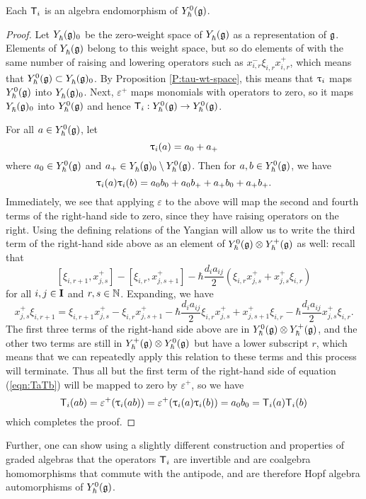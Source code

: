 \begin{lemma}\label{L:mbraid-hom}
    Each $\mbraid_i$ is an algebra endomorphism of $\Yhg[0]$.
\end{lemma}
\begin{proof}
    Let $\Yhg_0$ be the zero-weight space of $\Yhg$ as a representation of $\g$.
    Elements of $\Yhg$ belong to this weight space, but so do elements of with the same number of raising and lowering operators such as $x^-_{i,r}\xi_{i,r}x^+_{i,r}$, which means that $\Yhg[0]\subset\Yhg_0$.
    By Proposition \ref{P:tau-wt-space}, this means that $\braid_i$ maps $\Yhg[0]$ into $\Yhg_0$.
    Next, $\varepsilon^+$ maps monomials with operators to zero, so it maps $\Yhg_0$ into $\Yhg[0]$ and hence $\mbraid_i:\Yhg[0]\to\Yhg[0]$.

    For all $a\in\Yhg[0]$, let
    \[\braid_i(a) = a_0+a_+\]
    where $a_0\in\Yhg[0]$ and $a_+\in\Yhg_0\setminus\Yhg[0]$.
    Then for $a,b\in\Yhg[0]$, we have
    \begin{equation}\label{eqn:TaTb}
        \braid_i(a)\braid_i(b) = a_0b_0 + a_0b_+ + a_+b_0 + a_+b_+.
    \end{equation}
    Immediately, we see that applying $\varepsilon$ to the above will map the second and fourth terms of the right-hand side to zero, since they have raising operators on the right.
    Using the defining relations of the Yangian will allow us to write the third term of the right-hand side above as an element of $\Yhg[0]\otimes\Yhg[+]$ as well: recall that
    \[[\xi_{i,r+1},x^+_{j,s}]-[\xi_{i,r},x^+_{j,s+1}]-\hbar\frac{d_ia_{ij}}{2}(\xi_{i,r}x^+_{j,s}+x^+_{j,s}\xi_{i,r})\]
    for all $i,j\in\I$ and $r,s\in\N$.
    Expanding, we have
    \[x^+_{j,s}\xi_{i,r+1}=\xi_{i,r+1}x^+_{j,s} -\xi_{i,r}x^+_{j,s+1} -\hbar\frac{d_ia_{ij}}{2}\xi_{i,r}x^+_{j,s} +x^+_{j,s+1}\xi_{i,r} -\hbar\frac{d_ia_{ij}}{2}x^+_{j,s}\xi_{i,r}.\]
    The first three terms of the right-hand side above are in $\Yhg[0]\otimes\Yhg[+]$, and the other two terms are still in $\Yhg[+]\otimes\Yhg[0]$ but have a lower subscript $r$, which means that we can repeatedly apply this relation to these terms and this process will terminate.
    Thus all but the first term of the right-hand side of equation (\ref{eqn:TaTb}) will be mapped to zero by $\varepsilon^+$, so we have
    \[\mbraid_i(ab) = \varepsilon^+(\braid_i(ab)) = \varepsilon^+(\braid_i(a)\braid_i(b)) = a_0b_0 = \mbraid_i(a)\mbraid_i(b)\]
    which completes the proof.
\end{proof}

Further, one can show using a slightly different construction and properties of graded algebras that the operators $\mbraid_i$ are invertible and are coalgebra homomorphisms that commute with the antipode, and are therefore Hopf algebra automorphisms of $\Yhg[0]$.

